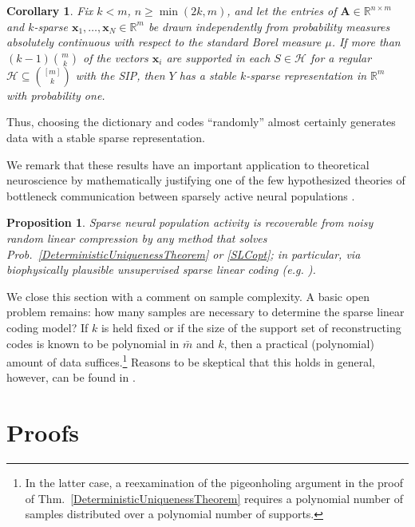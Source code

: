 \documentclass[9pt,twocolumn]{pnas-new}
\newtheorem{proposition}{Proposition}
\newtheorem{corollary}{Corollary}
\begin{document}
\begin{corollary}\label{ProbabilisticCor}
Fix $k < m$, $n \geq \min(2k, m)$, and let the entries of $\mathbf{A} \in \mathbb{R}^{n \times m}$ and $k$-sparse $\mathbf{x}_1, \ldots, \mathbf{x}_N \in \mathbb{R}^m$ be drawn independently from probability measures absolutely continuous with respect to the standard Borel measure $\mu$. If more than $(k-1){m \choose k}$ of the vectors $\mathbf{x}_i$ are supported in each $S \in \mathcal{H}$ for a regular $\mathcal{H} \subseteq {[m] \choose k}$ with the SIP, then $Y$ has a stable $k$-sparse representation in $\mathbb{R}^m$ with probability one.
\end{corollary}

Thus, choosing the dictionary and codes ``randomly'' almost certainly generates data with a stable sparse representation.

We remark that these results have an important application to theoretical neuroscience by mathematically justifying one of the few hypothesized theories of bottleneck communication between sparsely active neural populations \cite{Isely10}. 

\begin{proposition}\label{neuroprop}
Sparse neural population activity is recoverable from noisy random linear compression by any method that solves Prob.~\ref{DeterministicUniquenessTheorem} or \ref{SLCopt}; in particular, via biophysically plausible unsupervised sparse linear coding (e.g. \cite{rehnsommer2007, rozell2007neurally, ganguli2012compressed}).
\end{proposition}

We close this section with a comment on sample complexity. A basic open problem remains: how many samples are necessary to determine the sparse linear coding model? If $k$ is held fixed or if the size of the support set of reconstructing codes is known to be polynomial in $\bar m$ and $k$, then a practical (polynomial) amount of data suffices.\footnote{In the latter case, a reexamination of the pigeonholing argument in the proof of Thm.~\ref{DeterministicUniquenessTheorem} requires a polynomial number of samples distributed over a polynomial number of supports.} Reasons to be skeptical that this holds in general, however, can be found in \cite{tillmann2014computational, tillmann2015computational}.

\section{Proofs}\label{DUT} %
\end{document}
